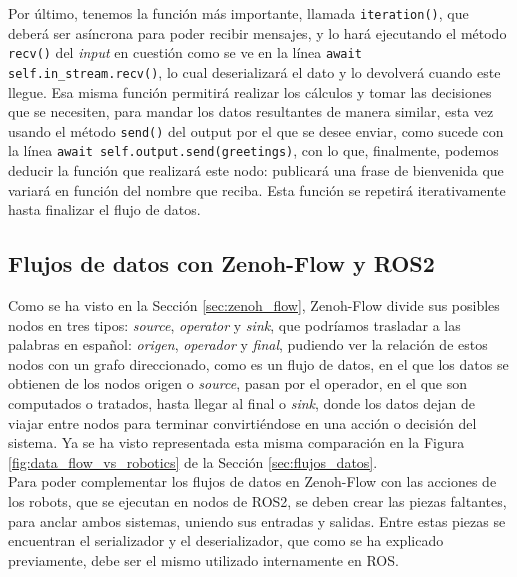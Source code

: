 Por último, tenemos la función más importante, llamada \verb|iteration()|, que
deberá ser asíncrona para poder recibir mensajes, y lo hará ejecutando el método
\verb|recv()| del \textit{input} en cuestión como se ve en la línea
\verb|await self.in_stream.recv()|, lo cual deserializará el dato y lo devolverá
cuando este llegue.
Esa misma función permitirá realizar los cálculos y tomar las decisiones que se
necesiten, para mandar los datos resultantes de manera similar, esta vez usando
el método \verb|send()| del output por el que se desee enviar, como sucede con
la línea \verb|await self.output.send(greetings)|, con lo que, finalmente,
podemos deducir la función que realizará este nodo: publicará una frase de
bienvenida que variará en función del nombre que reciba.
Esta función se repetirá iterativamente hasta finalizar el flujo de datos.
\\



\subsection{Flujos de datos con Zenoh-Flow y ROS2}
\label{sec:zf_ros}

Como se ha visto en la Sección \ref{sec:zenoh_flow}, Zenoh-Flow divide sus
posibles nodos en tres tipos: \textit{source}, \textit{operator} y
\textit{sink}, que podríamos trasladar a las palabras en español:
\textit{origen}, \textit{operador} y \textit{final}, pudiendo ver la relación de
estos nodos con un grafo direccionado, como es un flujo de datos, en el que los
datos se obtienen de los nodos origen o \textit{source}, pasan por el operador,
en el que son computados o tratados, hasta llegar al final o \textit{sink},
donde los datos dejan de viajar entre nodos para terminar convirtiéndose en una
acción o decisión del sistema.
Ya se ha visto representada esta misma comparación en la Figura
\ref{fig:data_flow_vs_robotics} de la Sección \ref{sec:flujos_datos}.
\\

Para poder complementar los flujos de datos en Zenoh-Flow con las acciones de
los robots, que se ejecutan en nodos de ROS2, se deben crear las piezas
faltantes, para anclar ambos sistemas, uniendo sus entradas y salidas.
Entre estas piezas se encuentran el serializador y el deserializador, que como
se ha explicado previamente, debe ser el mismo utilizado internamente en ROS.
\\

